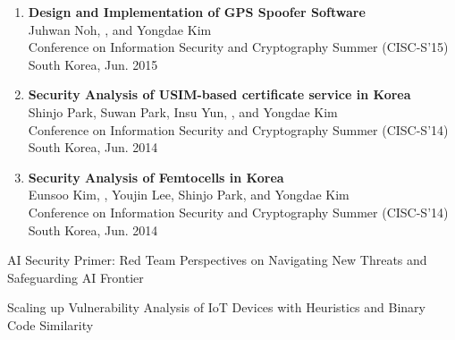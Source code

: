 \begin{enumerate}[leftmargin=1.5em]
    \item \textbf{Design and Implementation of GPS Spoofer Software} \\
        {\small
            Juhwan Noh, , and Yongdae Kim \\
            Conference on Information Security and Cryptography Summer (CISC-S’15)
        }
        \hfill {\small South Korea, Jun. 2015}
        
    \item \textbf{Security Analysis of USIM-based certificate service in Korea} \\
        {\small
            Shinjo Park, Suwan Park, Insu Yun, , and Yongdae Kim \\
            Conference on Information Security and Cryptography Summer (CISC-S’14)
        }
        \hfill {\small South Korea, Jun. 2014}
        
    \item \textbf{Security Analysis of Femtocells in Korea} \\
        {\small
            Eunsoo Kim, , Youjin Lee, Shinjo Park, and Yongdae Kim \\
            Conference on Information Security and Cryptography Summer (CISC-S’14)
        }
        \hfill {\small South Korea, Jun. 2014}
\end{enumerate}



\begin{timeitemize}{AI Security Primer: Red Team Perspectives on Navigating New Threats and Safeguarding AI Frontier}{}
\end{timeitemize}

\begin{timeitemize}{Scaling up Vulnerability Analysis of IoT Devices with Heuristics and Binary Code Similarity}{}
\end{timeitemize}


